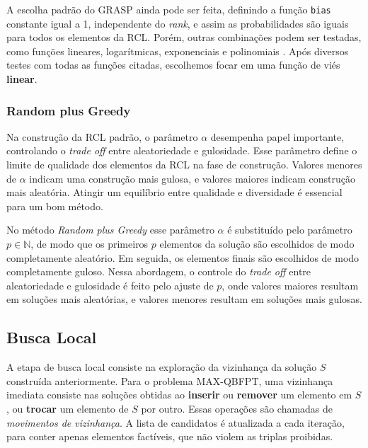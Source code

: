 \documentclass{MO824}
\newcommand{\N}{\mathbb{N}}
\begin{document}
    A escolha padrão do GRASP ainda pode ser feita, definindo a função \texttt{bias} constante igual a 1, independente do \textit{rank}, e assim as probabilidades são iguais para todos os elementos da RCL. Porém, outras combinações podem ser testadas, como funções lineares, logarítmicas, exponenciais e polinomiais \cite{grasp}. Após diversos testes com todas as funções citadas, escolhemos focar em uma função de viés \textbf{linear}.
    
    \subsubsection{Random plus Greedy} \label{rpg}
    Na construção da RCL padrão, o parâmetro $\alpha$ desempenha papel importante, controlando o \textit{trade off} entre aleatoriedade e gulosidade. Esse parâmetro define o limite de qualidade dos elementos da RCL na fase de construção. Valores menores de $\alpha$ indicam uma construção mais gulosa, e valores maiores indicam construção mais aleatória. Atingir um equilíbrio entre qualidade e diversidade é essencial para um bom método.
    
    No método \textit{Random plus Greedy} esse parâmetro $\alpha$ é substituído pelo parâmetro $p \in \N$, de modo que os primeiros $p$ elementos da solução são escolhidos de modo completamente aleatório. Em seguida, os elementos finais são escolhidos de modo completamente guloso. Nessa abordagem, o controle do \textit{trade off} entre aleatoriedade e gulosidade é feito pelo ajuste de $p$, onde valores maiores resultam em soluções mais aleatórias, e valores menores resultam em soluções mais gulosas.
    

\subsection{Busca Local}
    A etapa de busca local consiste na exploração da vizinhança da solução $S$ construída anteriormente. Para o problema MAX-QBFPT, uma vizinhança imediata consiste nas soluções obtidas ao \textbf{inserir} ou \textbf{remover} um elemento em $S$, ou \textbf{trocar} um elemento de $S$ por outro. Essas operações são chamadas de \textit{movimentos de vizinhança}. A lista de candidatos é atualizada a cada iteração, para conter apenas elementos factíveis, que não violem as triplas proibidas.
    
\end{document}
